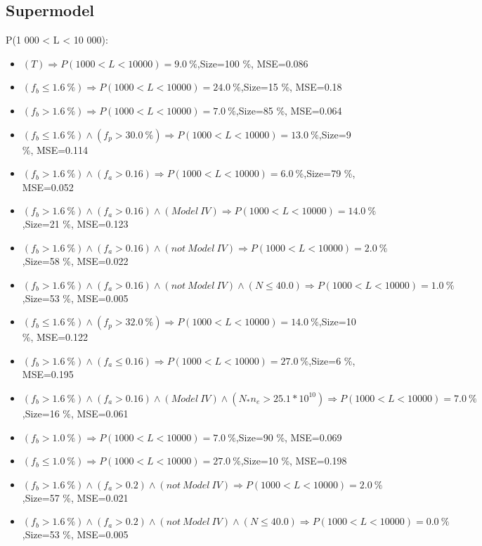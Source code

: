 \documentclass[numbered]{CSL}
\begin{document}
\subsection{Supermodel}
P(1 000 < L < 10 000):
\begin{itemize}
\item $(T) \Rightarrow P(1 000 < L < 10 000) = 9.0~\%$,\hfill Size=100 \%, MSE=0.086
\item $(f_b \leq 1.6~\%) \Rightarrow P(1 000 < L < 10 000) = 24.0~\%$,\hfill Size=15 \%, MSE=0.18
\item $(f_b > 1.6~\%) \Rightarrow P(1 000 < L < 10 000) = 7.0~\%$,\hfill Size=85 \%, MSE=0.064
\item $(f_b \leq 1.6~\%) \land (f_p > 30.0~\%) \Rightarrow P(1 000 < L < 10 000) = 13.0~\%$,\hfill Size=9 \%, MSE=0.114
\item $(f_b > 1.6~\%) \land (f_a > 0.16) \Rightarrow P(1 000 < L < 10 000) = 6.0~\%$,\hfill Size=79 \%, MSE=0.052
\item $(f_b > 1.6~\%) \land (f_a > 0.16) \land (Model~IV) \Rightarrow P(1 000 < L < 10 000) = 14.0~\%$,\hfill Size=21 \%, MSE=0.123
\item $(f_b > 1.6~\%) \land (f_a > 0.16) \land (not~Model~IV) \Rightarrow P(1 000 < L < 10 000) = 2.0~\%$,\hfill Size=58 \%, MSE=0.022
\item $(f_b > 1.6~\%) \land (f_a > 0.16) \land (not~Model~IV) \land (N \leq 40.0) \Rightarrow P(1 000 < L < 10 000) = 1.0~\%$,\hfill Size=53 \%, MSE=0.005
\item $(f_b \leq 1.6~\%) \land (f_p > 32.0~\%) \Rightarrow P(1 000 < L < 10 000) = 14.0~\%$,\hfill Size=10 \%, MSE=0.122
\item $(f_b > 1.6~\%) \land (f_a \leq 0.16) \Rightarrow P(1 000 < L < 10 000) = 27.0~\%$,\hfill Size=6 \%, MSE=0.195
\item $(f_b > 1.6~\%) \land (f_a > 0.16) \land (Model~IV) \land (N_* n_e > 25.1 * 10^{10}) \Rightarrow P(1 000 < L < 10 000) = 7.0~\%$,\hfill Size=16 \%, MSE=0.061
\item $(f_b > 1.0~\%) \Rightarrow P(1 000 < L < 10 000) = 7.0~\%$,\hfill Size=90 \%, MSE=0.069
\item $(f_b \leq 1.0~\%) \Rightarrow P(1 000 < L < 10 000) = 27.0~\%$,\hfill Size=10 \%, MSE=0.198
\item $(f_b > 1.6~\%) \land (f_a > 0.2) \land (not~Model~IV) \Rightarrow P(1 000 < L < 10 000) = 2.0~\%$,\hfill Size=57 \%, MSE=0.021
\item $(f_b > 1.6~\%) \land (f_a > 0.2) \land (not~Model~IV) \land (N \leq 40.0) \Rightarrow P(1 000 < L < 10 000) = 0.0~\%$,\hfill Size=53 \%, MSE=0.005

\end{itemize}
\end{document}
